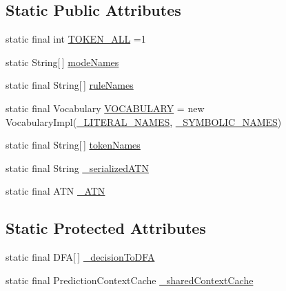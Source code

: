 \subsection*{Static Public Attributes}
\begin{DoxyCompactItemize}
\item 
static final int \hyperlink{classgov_1_1nasa_1_1jpf_1_1inspector_1_1client_1_1parser_1_1_console_grammar_lexer_ab3d953e6f185574917c1f0f158354553}{T\+O\+K\+E\+N\+\_\+\+A\+LL} =1
\item 
static String\mbox{[}$\,$\mbox{]} \hyperlink{classgov_1_1nasa_1_1jpf_1_1inspector_1_1client_1_1parser_1_1_console_grammar_lexer_a79c22f56202a04f73a2617e7ed3fb432}{mode\+Names}
\item 
static final String\mbox{[}$\,$\mbox{]} \hyperlink{classgov_1_1nasa_1_1jpf_1_1inspector_1_1client_1_1parser_1_1_console_grammar_lexer_a6dfd3b03865de7819bdcc0063436c3c1}{rule\+Names}
\item 
static final Vocabulary \hyperlink{classgov_1_1nasa_1_1jpf_1_1inspector_1_1client_1_1parser_1_1_console_grammar_lexer_aef69b636e123dab0c5baa2e315cb4928}{V\+O\+C\+A\+B\+U\+L\+A\+RY} = new Vocabulary\+Impl(\hyperlink{classgov_1_1nasa_1_1jpf_1_1inspector_1_1client_1_1parser_1_1_console_grammar_lexer_a8b778f8afc42ce4603bd9a45fc4a844f}{\+\_\+\+L\+I\+T\+E\+R\+A\+L\+\_\+\+N\+A\+M\+ES}, \hyperlink{classgov_1_1nasa_1_1jpf_1_1inspector_1_1client_1_1parser_1_1_console_grammar_lexer_a72b8ae418b3a739b6bf1af10dd824798}{\+\_\+\+S\+Y\+M\+B\+O\+L\+I\+C\+\_\+\+N\+A\+M\+ES})
\item 
static final String\mbox{[}$\,$\mbox{]} \hyperlink{classgov_1_1nasa_1_1jpf_1_1inspector_1_1client_1_1parser_1_1_console_grammar_lexer_ab8ed49d16553f8cf1819cb328b912a5d}{token\+Names}
\item 
static final String \hyperlink{classgov_1_1nasa_1_1jpf_1_1inspector_1_1client_1_1parser_1_1_console_grammar_lexer_ac2e2a7afc4d13c41b53ceddf4661e2c9}{\+\_\+serialized\+A\+TN}
\item 
static final A\+TN \hyperlink{classgov_1_1nasa_1_1jpf_1_1inspector_1_1client_1_1parser_1_1_console_grammar_lexer_afc31564da9d737d603885c8f9003d7d7}{\+\_\+\+A\+TN}
\end{DoxyCompactItemize}
\subsection*{Static Protected Attributes}
\begin{DoxyCompactItemize}
\item 
static final D\+FA\mbox{[}$\,$\mbox{]} \hyperlink{classgov_1_1nasa_1_1jpf_1_1inspector_1_1client_1_1parser_1_1_console_grammar_lexer_af8ac1b0c7a93a94478c786791e9dfb87}{\+\_\+decision\+To\+D\+FA}
\item 
static final Prediction\+Context\+Cache \hyperlink{classgov_1_1nasa_1_1jpf_1_1inspector_1_1client_1_1parser_1_1_console_grammar_lexer_a6bfe1dd9808cbc1bf541cc960e4452f7}{\+\_\+shared\+Context\+Cache}
\end{DoxyCompactItemize}
